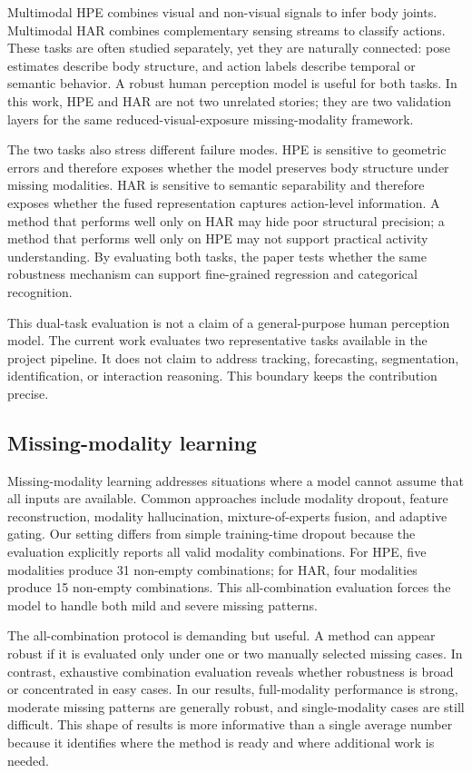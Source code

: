 \documentclass[preprint,12pt]{elsarticle}
\begin{document}
Multimodal HPE combines visual and non-visual signals to infer body joints. Multimodal HAR combines complementary sensing streams to classify actions. These tasks are often studied separately, yet they are naturally connected: pose estimates describe body structure, and action labels describe temporal or semantic behavior. A robust human perception model is useful for both tasks. In this work, HPE and HAR are not two unrelated stories; they are two validation layers for the same reduced-visual-exposure missing-modality framework.

The two tasks also stress different failure modes. HPE is sensitive to geometric errors and therefore exposes whether the model preserves body structure under missing modalities. HAR is sensitive to semantic separability and therefore exposes whether the fused representation captures action-level information. A method that performs well only on HAR may hide poor structural precision; a method that performs well only on HPE may not support practical activity understanding. By evaluating both tasks, the paper tests whether the same robustness mechanism can support fine-grained regression and categorical recognition.

This dual-task evaluation is not a claim of a general-purpose human perception model. The current work evaluates two representative tasks available in the project pipeline. It does not claim to address tracking, forecasting, segmentation, identification, or interaction reasoning. This boundary keeps the contribution precise.

\subsection{Missing-modality learning}

Missing-modality learning addresses situations where a model cannot assume that all inputs are available. Common approaches include modality dropout, feature reconstruction, modality hallucination, mixture-of-experts fusion, and adaptive gating. Our setting differs from simple training-time dropout because the evaluation explicitly reports all valid modality combinations. For HPE, five modalities produce 31 non-empty combinations; for HAR, four modalities produce 15 non-empty combinations. This all-combination evaluation forces the model to handle both mild and severe missing patterns.

The all-combination protocol is demanding but useful. A method can appear robust if it is evaluated only under one or two manually selected missing cases. In contrast, exhaustive combination evaluation reveals whether robustness is broad or concentrated in easy cases. In our results, full-modality performance is strong, moderate missing patterns are generally robust, and single-modality cases are still difficult. This shape of results is more informative than a single average number because it identifies where the method is ready and where additional work is needed.
\end{document}
